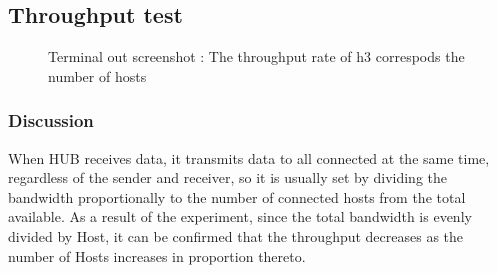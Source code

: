 \subsection{Throughput test}
\begin{figure}[h!]
\centering
\captionsetup[subfloat]{labelformat=empty}
\hfill
{}
\end{figure}

\clearpage
\begin{figure}[h!]
\centering
\captionsetup[subfloat]{labelformat=empty}
\caption{Terminal out screenshot : The throughput rate of h3 correspods the number of hosts}
\end{figure}
\vspace{-6mm}
\subsubsection*{Discussion}
When HUB receives data, it transmits data to all connected at the same time, regardless of the sender and receiver, so it is usually set by dividing the bandwidth proportionally to the number of connected hosts from the total available. As a result of the experiment, since the total bandwidth is evenly divided by Host, it can be confirmed that the throughput decreases as the number of Hosts increases in proportion thereto.